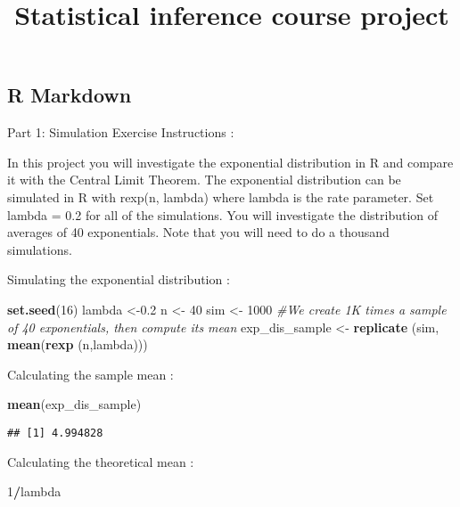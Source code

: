 \documentclass[
]{article}
\title{Statistical inference course project}
\author{}
\date{\vspace{-2.5em}}
\newenvironment{Shaded}{\begin{snugshade}}{\end{snugshade}}
\newcommand{\CommentTok}[1]{\textcolor[rgb]{0.56,0.35,0.01}{\textit{#1}}}
\newcommand{\DecValTok}[1]{\textcolor[rgb]{0.00,0.00,0.81}{#1}}
\newcommand{\FloatTok}[1]{\textcolor[rgb]{0.00,0.00,0.81}{#1}}
\newcommand{\KeywordTok}[1]{\textcolor[rgb]{0.13,0.29,0.53}{\textbf{#1}}}
\newcommand{\NormalTok}[1]{#1}
\newcommand{\OperatorTok}[1]{\textcolor[rgb]{0.81,0.36,0.00}{\textbf{#1}}}
\newcommand{\StringTok}[1]{\textcolor[rgb]{0.31,0.60,0.02}{#1}}
\begin{document}
\maketitle

\hypertarget{r-markdown}{%
\subsection{R Markdown}\label{r-markdown}}

Part 1: Simulation Exercise Instructions :

In this project you will investigate the exponential distribution in R
and compare it with the Central Limit Theorem. The exponential
distribution can be simulated in R with rexp(n, lambda) where lambda is
the rate parameter. Set lambda = 0.2 for all of the simulations. You
will investigate the distribution of averages of 40 exponentials. Note
that you will need to do a thousand simulations.

Simulating the exponential distribution :

\begin{Shaded}
\begin{Highlighting}[]
\KeywordTok{set.seed}\NormalTok{(}\DecValTok{16}\NormalTok{)}
\NormalTok{lambda <-}\FloatTok{0.2}
\NormalTok{n <-}\StringTok{ }\DecValTok{40}
\NormalTok{sim <-}\StringTok{ }\DecValTok{1000}
\CommentTok{#We create 1K times a sample of 40 exponentials, then compute its mean}
\NormalTok{exp_dis_sample <-}\StringTok{ }\KeywordTok{replicate}\NormalTok{ (sim, }\KeywordTok{mean}\NormalTok{(}\KeywordTok{rexp}\NormalTok{ (n,lambda)))}
\end{Highlighting}
\end{Shaded}

Calculating the sample mean :

\begin{Shaded}
\begin{Highlighting}[]
\KeywordTok{mean}\NormalTok{(exp_dis_sample)}
\end{Highlighting}
\end{Shaded}

\begin{verbatim}
## [1] 4.994828
\end{verbatim}

Calculating the theoretical mean :

\begin{Shaded}
\begin{Highlighting}[]
\DecValTok{1}\OperatorTok{/}\NormalTok{lambda}
\end{Highlighting}
\end{Shaded}
\end{document}
